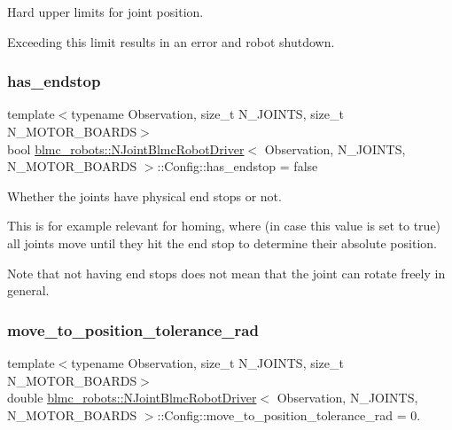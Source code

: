 Hard upper limits for joint position. 

Exceeding this limit results in an error and robot shutdown. \mbox{\label{structblmc__robots_1_1NJointBlmcRobotDriver_1_1Config_a8fb4f2f8ae75bf1555cd6c3ea5272541}} 
\subsubsection{\texorpdfstring{has\+\_\+endstop}{has\_endstop}}
{\footnotesize\ttfamily template$<$typename Observation, size\+\_\+t N\+\_\+\+J\+O\+I\+N\+TS, size\+\_\+t N\+\_\+\+M\+O\+T\+O\+R\+\_\+\+B\+O\+A\+R\+DS$>$ \\
bool \hyperlink{classblmc__robots_1_1NJointBlmcRobotDriver}{blmc\+\_\+robots\+::\+N\+Joint\+Blmc\+Robot\+Driver}$<$ Observation, N\+\_\+\+J\+O\+I\+N\+TS, N\+\_\+\+M\+O\+T\+O\+R\+\_\+\+B\+O\+A\+R\+DS $>$\+::Config\+::has\+\_\+endstop = false}



Whether the joints have physical end stops or not. 

This is for example relevant for homing, where (in case this value is set to true) all joints move until they hit the end stop to determine their absolute position.

Note that not having end stops does not mean that the joint can rotate freely in general. \mbox{\label{structblmc__robots_1_1NJointBlmcRobotDriver_1_1Config_ab4093c960a915b4ee5fdfde0684e3969}} 
\subsubsection{\texorpdfstring{move\+\_\+to\+\_\+position\+\_\+tolerance\+\_\+rad}{move\_to\_position\_tolerance\_rad}}
{\footnotesize\ttfamily template$<$typename Observation, size\+\_\+t N\+\_\+\+J\+O\+I\+N\+TS, size\+\_\+t N\+\_\+\+M\+O\+T\+O\+R\+\_\+\+B\+O\+A\+R\+DS$>$ \\
double \hyperlink{classblmc__robots_1_1NJointBlmcRobotDriver}{blmc\+\_\+robots\+::\+N\+Joint\+Blmc\+Robot\+Driver}$<$ Observation, N\+\_\+\+J\+O\+I\+N\+TS, N\+\_\+\+M\+O\+T\+O\+R\+\_\+\+B\+O\+A\+R\+DS $>$\+::Config\+::move\+\_\+to\+\_\+position\+\_\+tolerance\+\_\+rad = 0.}



